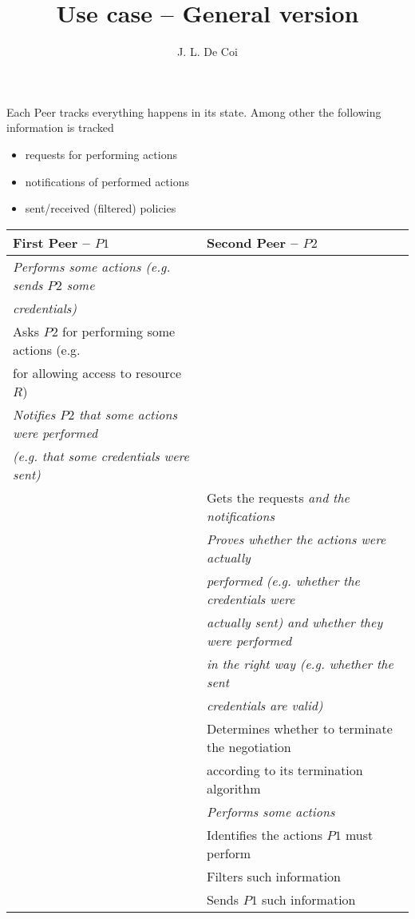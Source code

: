 \documentclass{article}
\begin{document}
\title{Use case -- General version}
\author{J. L. De Coi}
\maketitle

Each Peer tracks everything happens in its state. Among other the following information is tracked

\begin{itemize}
	\item requests for performing actions
	\item notifications of performed actions
	\item sent/received (filtered) policies
\end{itemize}

\begin{table}
\begin{tabular}{|l|l|}
\hline
\textbf{First Peer -- $P1$} & \textbf{Second Peer -- $P2$} \\
\hline
\textit{Performs some actions (e.g. sends $P2$ some} & \\
\textit{credentials)} & \\
Asks $P2$ for performing some actions (e.g. & \\
for allowing access to resource $R$) & \\
\textit{Notifies $P2$ that some actions were performed} & \\
\textit{(e.g. that some credentials were sent)} & \\
\hline
& Gets the requests \textit{and the notifications} \\
& \textit{Proves whether the actions were actually} \\
& \textit{performed (e.g. whether the credentials were} \\
& \textit{actually sent) and whether they were performed} \\
& \textit{in the right way (e.g. whether the sent} \\
& \textit{credentials are valid)} \\
& Determines whether to terminate the negotiation \\
& according to its termination algorithm \\
& \textit{Performs some actions} \\
& Identifies the actions $P1$ must perform \\
& Filters such information \\
& Sends $P1$ such information \\

\end{tabular}
\end{table}
\end{document}
